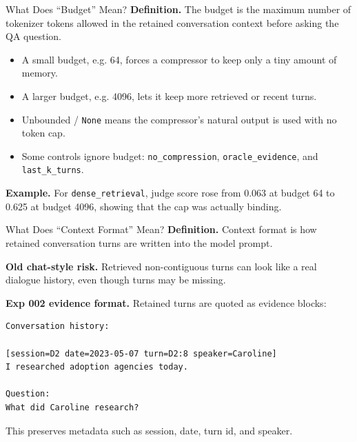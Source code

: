\documentclass[aspectratio=169]{beamer}
\newcommand{\method}[1]{\texttt{#1}}
\newcommand{\metric}[1]{\textbf{#1}}
\begin{document}
\begin{frame}{What Does ``Budget'' Mean?}
\metric{Definition.} The budget is the maximum number of tokenizer tokens allowed in the retained conversation context before asking the QA question.

\vspace{0.5em}
\begin{itemize}
  \item A small budget, e.g. 64, forces a compressor to keep only a tiny amount of memory.
  \item A larger budget, e.g. 4096, lets it keep more retrieved or recent turns.
  \item Unbounded / \method{None} means the compressor's natural output is used with no token cap.
  \item Some controls ignore budget: \method{no\_compression}, \method{oracle\_evidence}, and \method{last\_k\_turns}.
\end{itemize}

\vspace{0.5em}
\metric{Example.} For \method{dense\_retrieval}, judge score rose from 0.063 at budget 64 to 0.625 at budget 4096, showing that the cap was actually binding.
\end{frame}

\begin{frame}[fragile]{What Does ``Context Format'' Mean?}
\metric{Definition.} Context format is how retained conversation turns are written into the model prompt.

\vspace{0.5em}
\metric{Old chat-style risk.} Retrieved non-contiguous turns can look like a real dialogue history, even though turns may be missing.

\vspace{0.5em}
\metric{Exp 002 evidence format.} Retained turns are quoted as evidence blocks:
\begin{verbatim}
Conversation history:

[session=D2 date=2023-05-07 turn=D2:8 speaker=Caroline]
I researched adoption agencies today.

Question:
What did Caroline research?
\end{verbatim}
\vspace{-0.5em}
This preserves metadata such as session, date, turn id, and speaker.
\end{frame}
\end{document}
